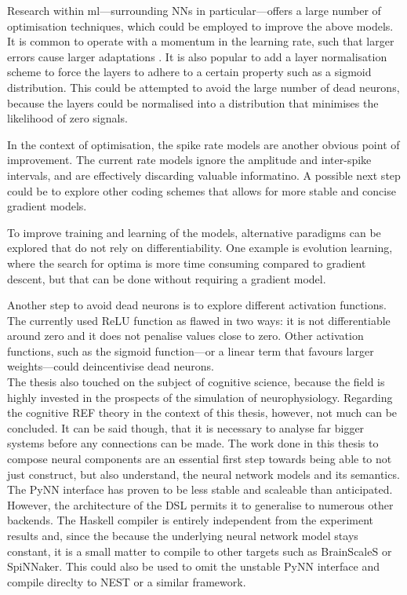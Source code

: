 \documentclass[report.tex]{subfiles}
\begin{document}
Research within \gls{ml}---surrounding \glspl{NN} in particular---offers a large
number of optimisation techniques, which could be employed to improve the above
models.
It is common to operate with a momentum in the learning rate, such that
larger errors cause larger adaptations \cite{Montavon1998, Sutskever2013}.
It is also popular to add a layer normalisation scheme to force the layers to
adhere to a certain property such as a sigmoid distribution.
This could be attempted to avoid the large number of dead neurons, because the
layers could be normalised into a distribution that minimises the likelihood of
zero signals.

In the context of optimisation, the spike rate models are another obvious point
of improvement.
The current rate models ignore the amplitude and inter-spike intervals, and are
effectively discarding valuable informatino.
A possible next step could be to explore other coding schemes that
allows for more stable and concise gradient models.

To improve training and learning of the models, alternative paradigms can be explored that do not
rely on differentiability. 
One example is evolution learning, where the search for optima is more time 
consuming compared to gradient descent, but that can be done without requiring a gradient model.

Another step to avoid dead neurons is to explore different activation functions. 
The currently used ReLU function as flawed in two ways: it is not
differentiable around zero and it does not penalise values close to
zero.
Other activation functions, such as the sigmoid function---or a linear term
that favours larger weights---could deincentivise dead neurons.
\\[0.1cm]

The thesis also touched on the subject of cognitive science, because the field
is highly invested in the prospects of the simulation of neurophysiology.
Regarding the cognitive REF theory in the context of this thesis, however, not much can be concluded.
It can be said though, that it is necessary to analyse far bigger systems before
any connections can be made.
The work done in this thesis to compose neural components are an essential first
step towards being able to not just construct, but also understand, the neural
network models and its semantics.
\\[0.1cm]

The PyNN interface has proven to be less stable and scaleable than anticipated.
However, the architecture of the \gls{DSL} permits it to generalise to numerous
other backends.
The Haskell compiler is entirely independent from the experiment
results and, since the because the underlying neural network model stays constant, 
it is a small matter to compile to other targets such as BrainScaleS or
SpiNNaker.
This could also be used to omit the unstable PyNN interface and compile direclty
to NEST or a similar framework.
\end{document}
